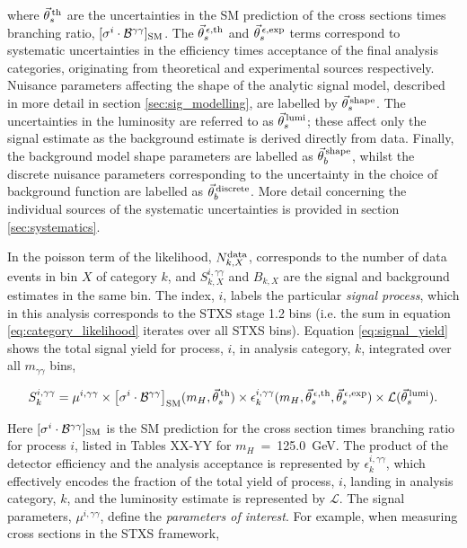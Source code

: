 \noindent
where $\vec{\theta}^{\,\rm{th}}_{s}$ are the uncertainties in the SM prediction of the cross sections times branching ratio, $[\sigma^i \cdot \mathcal{B}^{\gamma\gamma}]_{\rm{SM}}$. The $\vec{\theta}^{\,\epsilon,{\rm{th}}}_{s}$ and $\vec{\theta}^{\,\epsilon,{\rm{exp}}}_{s}$ terms correspond to systematic uncertainties in the efficiency times acceptance of the final analysis categories, originating from theoretical and experimental sources respectively. Nuisance parameters affecting the shape of the analytic signal model, described in more detail in section \ref{sec:sig_modelling}, are labelled by $\vec{\theta}^{\,\rm{shape}}_{s}$. The uncertainties in the luminosity are referred to as $\vec{\theta}^{\,\rm{lumi}}_{s}$; these affect only the signal estimate as the background estimate is derived directly from data. Finally, the background model shape parameters are labelled as $\vec{\theta}^{\,\rm{shape}}_{b}$, whilst the discrete nuisance parameters corresponding to the uncertainty in the choice of background function are labelled as $\vec{\theta}^{\,\rm{discrete}}_{b}$. More detail concerning the individual sources of the systematic uncertainties is provided in section \ref{sec:systematics}.

In the poisson term of the likelihood, $N_{k,X}^{\rm{data}}$, corresponds to the number of data events in bin $X$ of category $k$, and $S_{k,X}^{i,\gamma\gamma}$ and $B_{k,X}$ are the signal and background estimates in the same bin. The index, $i$, labels the particular \textit{signal process}, which in this analysis corresponds to the STXS stage 1.2 bins (i.e. the sum in equation \ref{eq:category_likelihood} iterates over all STXS bins). Equation \ref{eq:signal_yield} shows the total signal yield for process, $i$, in analysis category, $k$, integrated over all $m_{\gamma\gamma}$ bins,

\begin{equation}\label{eq:signal_yield}
    S_k^{i,\gamma\gamma} = \mu^{i,\gamma\gamma} \times \big[\sigma^i \cdot \mathcal{B}^{\gamma\gamma} \big]_{\rm{SM}}(m_H,\vec{\theta}^{\,\rm{th}}_{s}) \times \epsilon^{i,\gamma\gamma}_k(m_H,\vec{\theta}^{\,\epsilon,{\rm{th}}}_{s}, \vec{\theta}^{\,\epsilon,{\rm{exp}}}_{s}) \times \mathcal{L}(\vec{\theta}^{\,\rm{lumi}}_{s}).
\end{equation}

\noindent
Here $[\sigma^i \cdot \mathcal{B}^{\gamma\gamma}]_{\rm{SM}}$ is the SM prediction for the cross section times branching ratio for process $i$, listed in Tables XX-YY for $m_H$~=~125.0~GeV. The product of the detector efficiency and the analysis acceptance is represented by $\epsilon^{i,\gamma\gamma}_k$, which effectively encodes the fraction of the total yield of process, $i$, landing in analysis category, $k$, and the luminosity estimate is represented by $\mathcal{L}$. The signal parameters, $\mu^{i,\gamma\gamma}$, define the \textit{parameters of interest}. For example, when measuring cross sections in the STXS framework,

